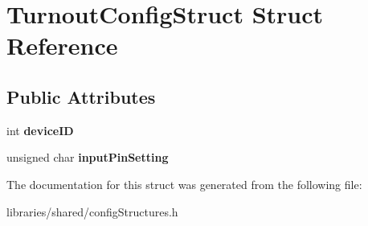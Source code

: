 \hypertarget{struct_turnout_config_struct}{}\section{Turnout\+Config\+Struct Struct Reference}
\label{struct_turnout_config_struct}
\subsection*{Public Attributes}
\begin{DoxyCompactItemize}
\item 
\mbox{\label{struct_turnout_config_struct_a993785b9805c45d0ce04a814b44d58b5}} 
int {\bfseries device\+ID}
\item 
\mbox{\label{struct_turnout_config_struct_a03accbd850f69825293530fdca9b743f}} 
unsigned char {\bfseries input\+Pin\+Setting}
\end{DoxyCompactItemize}


The documentation for this struct was generated from the following file\+:\begin{DoxyCompactItemize}
\item 
libraries/shared/config\+Structures.\+h\end{DoxyCompactItemize}
